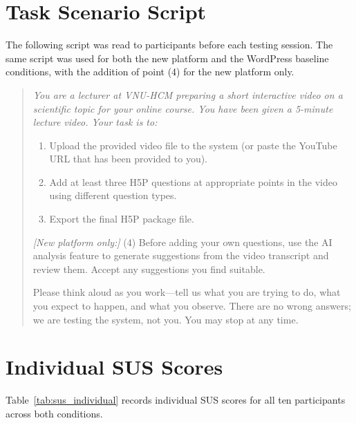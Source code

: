 \section{Task Scenario Script}

The following script was read to participants before each testing session.
The same script was used for both the new platform and the WordPress
baseline conditions, with the addition of point (4) for the new platform
only.

\begin{quote}
\itshape
You are a lecturer at VNU-HCM preparing a short interactive video on a
scientific topic for your online course. You have been given a 5-minute
lecture video. Your task is to:

\begin{enumerate}
  \item Upload the provided video file to the system (or paste the
  YouTube URL that has been provided to you).
  \item Add at least three H5P questions at appropriate points in the
  video using different question types.
  \item Export the final H5P package file.
\end{enumerate}

\textit{[New platform only:]} (4) Before adding your own questions, use
the AI analysis feature to generate suggestions from the video transcript
and review them. Accept any suggestions you find suitable.

Please think aloud as you work---tell us what you are trying to do, what
you expect to happen, and what you observe. There are no wrong answers; we
are testing the system, not you. You may stop at any time.
\end{quote}

\section{Individual SUS Scores}

Table~\ref{tab:sus_individual} records individual SUS scores for all ten
participants across both conditions.

